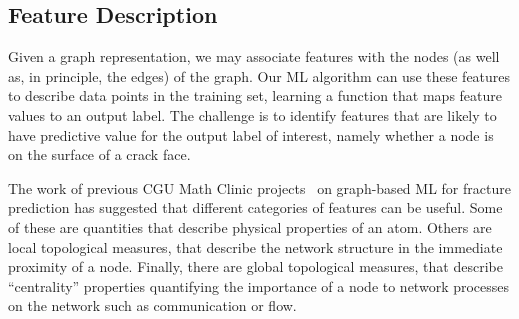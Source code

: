 
\subsection{Feature Description}
\label{subsec: Features}


Given a graph representation, we may associate features with the nodes (as well as, in principle, the edges) of the graph.  Our ML algorithm can use these features to describe data points in the training set, learning a function that maps feature values to an output label.  The challenge is to identify features that are likely to have predictive value for the output label of interest, namely whether a node is on the surface of a crack face.


The work of previous CGU Math Clinic projects~\cite{valera2018machine,schwarzer2019learning} on graph-based ML for fracture prediction has suggested that different categories of features can be useful. Some of these are quantities that describe physical properties of an atom.  Others are local topological measures, that describe the network structure in the immediate proximity of a node. Finally, there are global topological measures, that describe ``centrality'' properties quantifying the importance of a node to network processes on the network such as communication or flow.

